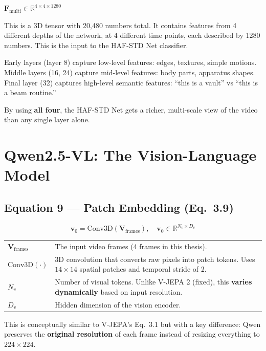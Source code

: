 \documentclass[12pt, a4paper]{article}
\begin{document}
\begin{examplebox}
$\mathbf{F}_{\text{multi}} \in \mathbb{R}^{4 \times 4 \times 1280}$

This is a 3D tensor with 20,480 numbers total. It contains features from 4 different depths of the network, at 4 different time points, each described by 1280 numbers. This is the input to the HAF-STD Net classifier.
\end{examplebox}

\begin{analogybox}
Early layers (layer 8) capture low-level features: edges, textures, simple motions.
Middle layers (16, 24) capture mid-level features: body parts, apparatus shapes.
Final layer (32) captures high-level semantic features: ``this is a vault'' vs ``this is a beam routine.''

By using \textbf{all four}, the HAF-STD Net gets a richer, multi-scale view of the video than any single layer alone.
\end{analogybox}


\newpage
\section{Qwen2.5-VL: The Vision-Language Model}

\subsection{Equation 9 --- Patch Embedding (Eq.~3.9)}

\begin{eqbox}
\[
\mathbf{v}_0 = \text{Conv3D}(\mathbf{V}_{\text{frames}}), \quad \mathbf{v}_0 \in \mathbb{R}^{N_v \times D_v}
\]
\end{eqbox}

\begin{explainbox}
\begin{tabular}{lp{11cm}}
$\mathbf{V}_{\text{frames}}$ & The input video frames (4 frames in this thesis).\\[0.2cm]
$\text{Conv3D}(\cdot)$ & 3D convolution that converts raw pixels into patch tokens. Uses $14 \times 14$ spatial patches and temporal stride of 2.\\[0.2cm]
$N_v$ & Number of visual tokens. Unlike V-JEPA 2 (fixed), this \textbf{varies dynamically} based on input resolution.\\[0.2cm]
$D_v$ & Hidden dimension of the vision encoder.
\end{tabular}

This is conceptually similar to V-JEPA's Eq.~3.1 but with a key difference: Qwen preserves the \textbf{original resolution} of each frame instead of resizing everything to $224 \times 224$.
\end{explainbox}
\end{document}

